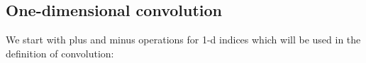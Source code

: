 \subsection{One-dimensional convolution}
We start with plus and minus operations for 1-d indices which will
be used in the definition of convolution:
\begin{code}[hide]%
%
\>[2]\AgdaSpace{}%
\AgdaSymbol{:}\AgdaSpace{}%
\AgdaSpace{}%
\AgdaSymbol{(}\AgdaSpace{}%
\AgdaSymbol{)}\AgdaSpace{}%
\AgdaSpace{}%
\AgdaSpace{}%
\AgdaSymbol{(}\AgdaSpace{}%
\AgdaSymbol{(}\AgdaSpace{}%
\AgdaOperator{\AgdaPrimitive{+}}\AgdaSpace{}%
\AgdaSymbol{))}\<%
\\
%
\>[2]\AgdaSpace{}%
\AgdaSymbol{\{}\AgdaSymbol{\}}\AgdaSpace{}%
\AgdaSymbol{\{}\AgdaSymbol{\}}\AgdaSpace{}%
\AgdaSpace{}%
\AgdaSpace{}%
\AgdaSpace{}%
\AgdaSpace{}%
%
\>[44]\AgdaSymbol{=}\AgdaSpace{}%
\AgdaSpace{}%
\AgdaSymbol{\AgdaUnderscore{}}\AgdaSpace{}%
\<%
\\
\>[0]\<%
\\
%
\>[2]\AgdaSpace{}%
\AgdaSymbol{:}\AgdaSpace{}%
\AgdaSymbol{(}\AgdaSpace{}%
\AgdaSymbol{:}\AgdaSpace{}%
\AgdaSpace{}%
\AgdaSymbol{(}\AgdaSpace{}%
\AgdaOperator{\AgdaPrimitive{+}}\AgdaSpace{}%
\AgdaSymbol{))}\AgdaSpace{}%
\AgdaSymbol{(}\AgdaSpace{}%
\AgdaSymbol{:}\AgdaSpace{}%
\AgdaSpace{}%
\AgdaSymbol{)}\AgdaSpace{}%
\AgdaSpace{}%
\AgdaSpace{}%
\AgdaSpace{}%
\AgdaSpace{}%
\AgdaSpace{}%
\AgdaSpace{}%
\AgdaSpace{}%
\AgdaSpace{}%
\AgdaSpace{}%
\AgdaSymbol{\AgdaUnderscore{}}\AgdaSpace{}%
\AgdaSpace{}%
\AgdaSpace{}%
\<%
\\
%
\>[2]\AgdaSpace{}%
\AgdaSymbol{\{}\AgdaSpace{}%
\AgdaSymbol{\}}\AgdaSpace{}%
\AgdaSpace{}%
\AgdaSpace{}%

\end{code}
